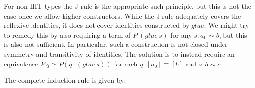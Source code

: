 For non-HIT types the J-rule is the appropriate such principle, but this is not
the case once we allow higher constructors. While the J-rule
adequately covers the reflexive identities, it does not cover identities
constructed by $glue$. We might try to remedy this by also requiring a term of
$P~(glue~s)$ for any $s : a_0 \sim b$, but this is also not sufficient. In
particular, such a construction is not closed under symmetry and transitivity of
identities.
The solution is to instead require an equivalence $P~q \simeq P (q \cdot
(glue~s))$ for each $q : [a_0] \equiv [ b ]$ and $s : b \sim c$.

The complete induction rule is given by:
\begin{code}[hide]%
%
\>[2]\<%
\\
\>[2][@{}l@{\AgdaIndent{0}}]%
\>[4]\AgdaSpace{}%
\AgdaSymbol{:}\<%
\\
\>[4][@{}l@{\AgdaIndent{0}}]%
\>[6]\AgdaSymbol{\{}\AgdaSpace{}%
\AgdaSymbol{:}\AgdaSpace{}%
\AgdaSymbol{\}}\<%
\\
%
\>[6]\AgdaSymbol{\{}\AgdaSpace{}%
\AgdaSymbol{:}\AgdaSpace{}%
\AgdaSymbol{\}}\<%
\\
%
\>[6]\AgdaSymbol{(}\AgdaSpace{}%
\AgdaSymbol{:}\AgdaSpace{}%
\AgdaSymbol{\{}\AgdaSpace{}%
\AgdaSymbol{:}\AgdaSpace{}%
\AgdaSymbol{\}}\AgdaSpace{}%
\AgdaSpace{}%
\AgdaOperator{\AgdaInductiveConstructor{[}}\AgdaSpace{}%
\AgdaSpace{}%
\AgdaOperator{\AgdaInductiveConstructor{]}}\AgdaSpace{}%
\AgdaSpace{}%
\AgdaOperator{\AgdaInductiveConstructor{[}}\AgdaSpace{}%
\AgdaSpace{}%
\AgdaOperator{\AgdaInductiveConstructor{]}}\AgdaSpace{}%
\AgdaSpace{}%
\AgdaSpace{}%
\AgdaSymbol{)}\<%
\\
%
\>[6]\AgdaSpace{}%
\AgdaSpace{}%
\<%
\\
%
\>[6]\AgdaSpace{}%
\AgdaSymbol{(\{}\AgdaSpace{}%
\AgdaSymbol{:}\AgdaSpace{}%
\AgdaSymbol{\}}\AgdaSpace{}%
\AgdaSpace{}%
\AgdaSymbol{(}\AgdaSpace{}%
\AgdaSymbol{:}\AgdaSpace{}%
\AgdaOperator{\AgdaInductiveConstructor{[}}\AgdaSpace{}%
\AgdaSpace{}%
\AgdaOperator{\AgdaInductiveConstructor{]}}\AgdaSpace{}%
\AgdaSpace{}%
\AgdaOperator{\AgdaInductiveConstructor{[}}\AgdaSpace{}%
\AgdaSpace{}%

\end{code}
